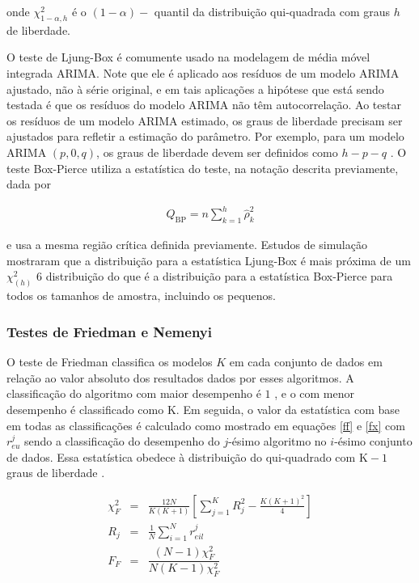 \noindent onde $\chi_{1-\alpha, h}^2$ é o $(1-\alpha)-$ quantil \cite{Brockwell2002} da distribuição qui-quadrada com graus $h$ de liberdade.
 
O teste de Ljung-Box é comumente usado na modelagem de média móvel integrada ARIMA. Note que ele é aplicado aos resíduos de um modelo ARIMA ajustado, não à série original, e em tais aplicações a hipótese que está sendo testada é que os resíduos do modelo ARIMA não têm autocorrelação. Ao testar os resíduos de um modelo ARIMA estimado, os graus de liberdade precisam ser ajustados para refletir a estimação do parâmetro. Por exemplo, para um modelo ARIMA $(p,0,q)$, os graus de liberdade devem ser definidos como $h-p-q$ \cite{Davidson2000}. O teste Box-Pierce utiliza a estatística do teste, na notação descrita previamente, dada por \cite{box}
 
 \begin{eqnarray}
 	Q_{\mathrm{BP}}=n \sum_{k=1}^h \hat{\rho}_k^2
 \end{eqnarray}
 
\noindent e usa a mesma região crítica definida previamente.
Estudos de simulação mostraram que a distribuição para a estatística Ljung-Box é mais próxima de um $\chi^2_{(h)}$ $6$ distribuição do que é a distribuição para a estatística Box-Pierce para todos os tamanhos de amostra, incluindo os pequenos.
 
 
\subsubsection{Testes de Friedman e Nemenyi}
 
O teste de Friedman classifica os modelos $K$ em cada conjunto de dados em relação ao valor absoluto dos resultados dados por esses algoritmos. A classificação do algoritmo com maior desempenho é $1$ , e o com menor desempenho é classificado como $\mathrm{K}$. Em seguida, o valor da estatística com base em todas as classificações é calculado como mostrado em equações \eqref{ff} e \eqref{fx} com $r_{e u}^j$ sendo a classificação do desempenho do $j$-ésimo algoritmo no $i$-ésimo conjunto de dados. Essa estatística obedece à distribuição do qui-quadrado com $\mathrm{K}-1$ graus de liberdade \cite{Liu2022}.
 
 \begin{eqnarray}
 	\chi_F^2 & =&\frac{12 N}{K(K+1)}\left[\sum_{j=1}^K R_j^2-\frac{K(K+1)^2}{4}\right] \label{ff}\\
 	R_j & =&\frac{1}{N} \sum_{i=1}^N r_{e i l}^j \label{fx}\\
 	F_F&=&\dfrac{(N-1) \chi_F^2}{N(K-1) \chi_F^2}\label{fx1}
 \end{eqnarray}
 
